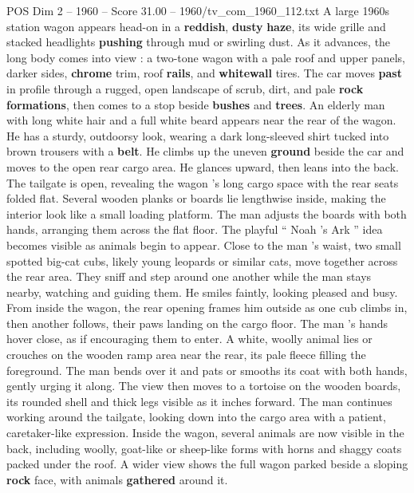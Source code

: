 \begin{textsample}{POS Dim 2 – 1960 – Score 31.00 – 1960/tv\_com\_1960\_112.txt}  \label{ex:f2_pos_003}
A large 1960s station wagon appears head-on in a \textbf{reddish}, \textbf{dusty} \textbf{haze}, its wide grille and stacked headlights \textbf{pushing} through mud or swirling dust.
As it advances, the long body comes into view : a two-tone wagon with a pale roof and upper panels, darker sides, \textbf{chrome} trim, roof \textbf{rails}, and \textbf{whitewall} tires.
The car moves \textbf{past} in profile through a rugged, open landscape of scrub, dirt, and pale \textbf{rock} \textbf{formations}, then comes to a stop beside \textbf{bushes} and \textbf{trees}.
An elderly man with long white hair and a full white beard appears near the rear of the wagon.
He has a sturdy, outdoorsy look, wearing a dark long-sleeved shirt tucked into brown trousers with a \textbf{belt}.
He climbs up the uneven \textbf{ground} beside the car and moves to the open rear cargo area.
He glances upward, then leans into the back.
The tailgate is open, revealing the wagon ’s long cargo space with the rear seats folded flat.
Several wooden planks or boards lie lengthwise inside, making the interior look like a small loading platform.
The man adjusts the boards with both hands, arranging them across the flat floor.
The playful “ Noah ’s Ark ” idea becomes visible as animals begin to appear.
Close to the man ’s waist, two small spotted big-cat cubs, likely young leopards or similar cats, move together across the rear area.
They sniff and step around one another while the man stays nearby, watching and guiding them.
He smiles faintly, looking pleased and busy.
From inside the wagon, the rear opening frames him outside as one cub climbs in, then another follows, their paws landing on the cargo floor.
The man ’s hands hover close, as if encouraging them to enter.
A white, woolly animal lies or crouches on the wooden ramp area near the rear, its pale fleece filling the foreground.
The man bends over it and pats or smooths its coat with both hands, gently urging it along.
The view then moves to a tortoise on the wooden boards, its rounded shell and thick legs visible as it inches forward.
The man continues working around the tailgate, looking down into the cargo area with a patient, caretaker-like expression.
Inside the wagon, several animals are now visible in the back, including woolly, goat-like or sheep-like forms with horns and shaggy coats packed under the roof.
A wider view shows the full wagon parked beside a sloping \textbf{rock} face, with animals \textbf{gathered} around it.

\end{textsample}
